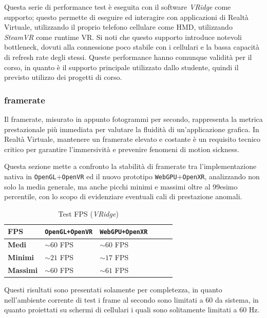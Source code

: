 \documentclass[a4paper, 11pt, twoside]{report}
\begin{document}
Questa serie di performance test è eseguita con il software \textit{VRidge} come supporto; questo permette di eseguire
ed interagire con applicazioni di Realtà Virtuale, utilizzando il proprio telefono cellulare come HMD, utilizzando
\textit{SteamVR} come runtime VR. Si noti che questo supporto introduce notevoli bottleneck, dovuti alla connessione
poco stabile con i cellulari e la bassa capacità di refresh rate degli stessi.
Queste performance hanno comunque validità per il corso, in quanto è il supporto principale utilizzato dallo studente,
quindi il previsto utilizzo dei progetti di corso.

\subsubsection{\gls{framerate}}

Il \gls{framerate}, misurato in appunto fotogrammi per secondo, rappresenta la metrica prestazionale più immediata per
valutare la fluidità di un'applicazione grafica. In Realtà Virtuale, mantenere un \gls{framerate} elevato e costante è
un requisito tecnico critico per garantire l'immersività e prevenire fenomeni di motion sickness.

Questa sezione mette a confronto la stabilità di \gls{framerate} tra l'implementazione nativa in
\texttt{OpenGL}+\texttt{\gls{OpenVR}} ed il nuovo prototipo \texttt{WebGPU}+\texttt{\gls{OpenXR}}, analizzando non solo
la media generale, ma anche picchi minimi e massimi oltre al 99esimo percentile, con lo scopo di evidenziare eventuali
cali di prestazione anomali.

\begin{table}[h]
\centering
\caption{Test FPS (\textit{VRidge})}
\begin{tabular}{lp{5cm}lp{5cm}lp{5cm}}
\toprule
\textbf{FPS} &
\textcolor{blue!40}{\textbf{\texttt{OpenGL+OpenVR}}} &
\textcolor{violet!75}{\textbf{\texttt{WebGPU+OpenXR}}} \\
\midrule
\textbf{Medi}    & $\sim60$ FPS & $\sim60$ FPS         \\
\textbf{Minimi}  & $\sim21$ FPS & $\sim17$ FPS         \\
\textbf{Massimi} & $\sim60$ FPS & $\sim61$ FPS         \\
\bottomrule
\end{tabular}
\end{table}

Questi risultati sono presentati solamente per completezza, in quanto nell'ambiente corrente di test i frame al secondo
sono limitati a $60$ da sistema, in quanto proiettati su schermi di cellulari i quali sono solitamente limitati a
$60$ Hz.
\end{document}
